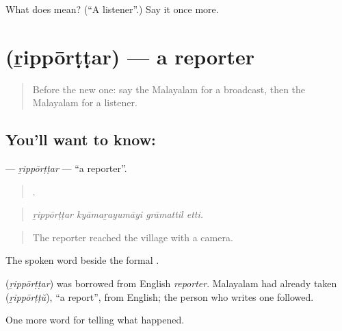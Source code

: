 \begin{tcolorbox}[breakable,colback=teal!4,colframe=teal!35!black,title={Before you move on}]
What does  mean? (\textquotedblleft{}A listener\textquotedblright{}.) Say it once more.
\end{tcolorbox}
\section[\texorpdfstring{\ml{റിപ്പോർട്ടർ} (ṟippōrṭṭar)}{റിപ്പോർട്ടർ (ṟippōrṭṭar)}]{ (ṟippōrṭṭar) — a reporter}

\label{lesson:ML-C351-ripporttar}



\begin{quote}
Before the new one: say the Malayalam for a broadcast, then the Malayalam for a listener.
\end{quote}

\subsection*{You'll want to know: }
\textbf{} — \emph{ṟippōrṭṭar} — \textquotedblleft{}a reporter\textquotedblright{}.

\begin{quote}
   .
\end{quote}

\begin{quote}
\emph{ṟippōrṭṭar kyāmaṟayumāyi grāmattil etti.}
\end{quote}

\begin{quote}
The reporter reached the village with a camera.
\end{quote}

The spoken word beside the formal .

\begin{cousinweb}
\textbf{} (\emph{ṟippōrṭṭar}) was borrowed from English \emph{reporter}. Malayalam had already taken  (\emph{ṟippōrṭṭŭ}), \textquotedblleft{}a report\textquotedblright{}, from English; the person who writes one followed.
\end{cousinweb}

\begin{grammarlens}[title={What you've built}]
One more word for telling what happened.
\end{grammarlens}

